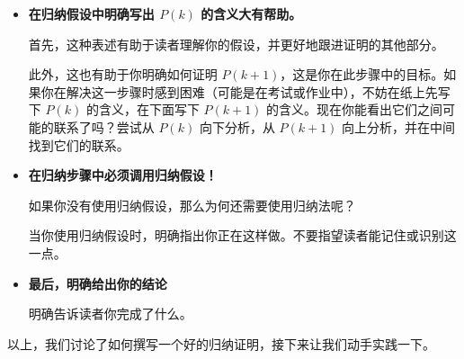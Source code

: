 \begin{itemize}
    \item \textbf{在归纳假设中明确写出 $P(k)$ 的含义大有帮助。}
    
    首先，这种表述有助于读者理解你的假设，并更好地跟进证明的其他部分。

    此外，这也有助于你明确如何证明 $P(k+1)$，这是你在此步骤中的目标。如果你在解决这一步骤时感到困难（可能是在考试或作业中），不妨在纸上先写下 $P(k)$ 的含义，在下面写下 $P(k+1)$ 的含义。现在你能看出它们之间可能的联系了吗？尝试从 $P(k)$ 向下分析，从 $P(k+1)$ 向上分析，并在中间找到它们的联系。

    \item \textbf{在归纳步骤中必须调用归纳假设！}
    
    如果你没有使用归纳假设，那么为何还需要使用归纳法呢？

    当你使用归纳假设时，明确指出你正在这样做。不要指望读者能记住或识别这一点。

    \item \textbf{最后，明确给出你的结论}
    
    明确告诉读者你完成了什么。\\
\end{itemize}

以上，我们讨论了如何撰写一个好的归纳证明，接下来让我们动手实践一下。
